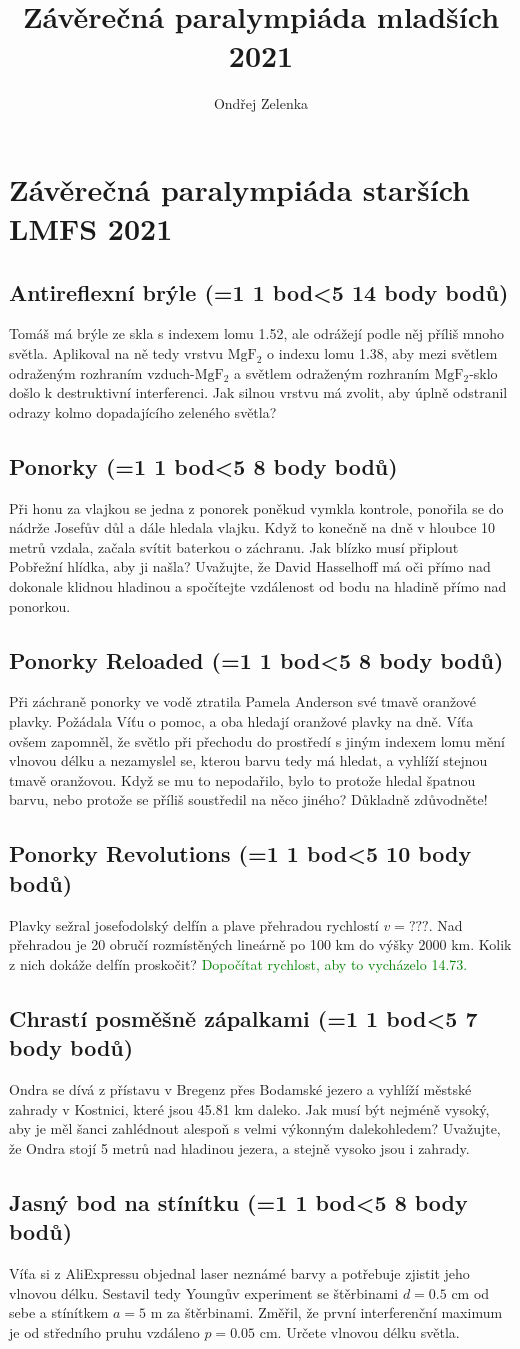 \documentclass[11pt,a4paper,landscape,twocolumn]{article}
\author{Ondřej Zelenka}
\title{Závěrečná paralympiáda mladších 2021}
\newcounter{bodycounter}
\newcommand{\bodystring}[1]{\ifnum #1=1 1 bod\else\ifnum #1<5 #1 body\else #1 bodů\fi\fi}
\newcommand{\uloha}[3]{
\subsection{#1 (\bodystring{#2})}
#3\addtocounter{bodycounter}{#2}}
\begin{document}
\section*{Závěrečná paralympiáda starších LMFS 2021}

\uloha{Antireflexní brýle}{14}{
Tomáš má brýle ze skla s indexem lomu 1.52, ale odrážejí podle něj příliš mnoho světla. Aplikoval na ně tedy vrstvu $\mathrm{MgF_2}$ o indexu lomu 1.38, aby mezi světlem odraženým rozhraním vzduch-$\mathrm{MgF_2}$ a světlem odraženým rozhraním $\mathrm{MgF_2}$-sklo došlo k destruktivní interferenci. Jak silnou vrstvu má zvolit, aby úplně odstranil odrazy kolmo dopadajícího zeleného světla?
}

\uloha{Ponorky}{8}{
Při honu za vlajkou se jedna z ponorek poněkud vymkla kontrole, ponořila se do nádrže Josefův důl a dále hledala vlajku. Když to konečně na dně v hloubce 10 metrů vzdala, začala svítit baterkou o záchranu. Jak blízko musí připlout Pobřežní hlídka, aby ji našla? Uvažujte, že David Hasselhoff má oči přímo nad dokonale klidnou hladinou a spočítejte vzdálenost od bodu na hladině přímo nad ponorkou.
}

\uloha{Ponorky Reloaded}{8}{
Při záchraně ponorky ve vodě ztratila Pamela Anderson své tmavě oranžové plavky. Požádala Víťu o pomoc, a oba hledají oranžové plavky na dně. Víťa ovšem zapomněl, že světlo při přechodu do prostředí s jiným indexem lomu mění vlnovou délku a nezamyslel se, kterou barvu tedy má hledat, a vyhlíží stejnou tmavě oranžovou. Když se mu to nepodařilo, bylo to protože hledal špatnou barvu, nebo protože se příliš soustředil na něco jiného? Důkladně zdůvodněte!
}

\uloha{Ponorky Revolutions}{10}{
Plavky sežral josefodolský delfín a plave přehradou rychlostí $v = ???$. Nad přehradou je 20 obručí rozmístěných lineárně po 100 km do výšky 2000 km. Kolik z nich dokáže delfín proskočit? \textcolor{green}{Dopočítat rychlost, aby to vycházelo 14.73.}
}

\uloha{Chrastí posměšně zápalkami}{7}{
Ondra se dívá z přístavu v Bregenz přes Bodamské jezero a vyhlíží městské zahrady v Kostnici, které jsou 45.81 km daleko. Jak musí být nejméně vysoký, aby je měl šanci zahlédnout alespoň s velmi výkonným dalekohledem? Uvažujte, že Ondra stojí 5 metrů nad hladinou jezera, a stejně vysoko jsou i zahrady.
}

\uloha{Jasný bod na stínítku}{8}{
Víťa si z AliExpressu objednal laser neznámé barvy a potřebuje zjistit jeho vlnovou délku. Sestavil tedy Youngův experiment se štěrbinami $d = 0.5$ cm od sebe a stínítkem $a = 5$ m za štěrbinami. Změřil, že první interferenční maximum je od středního pruhu vzdáleno $p = 0.05$ cm. Určete vlnovou délku světla.
}
\end{document}
